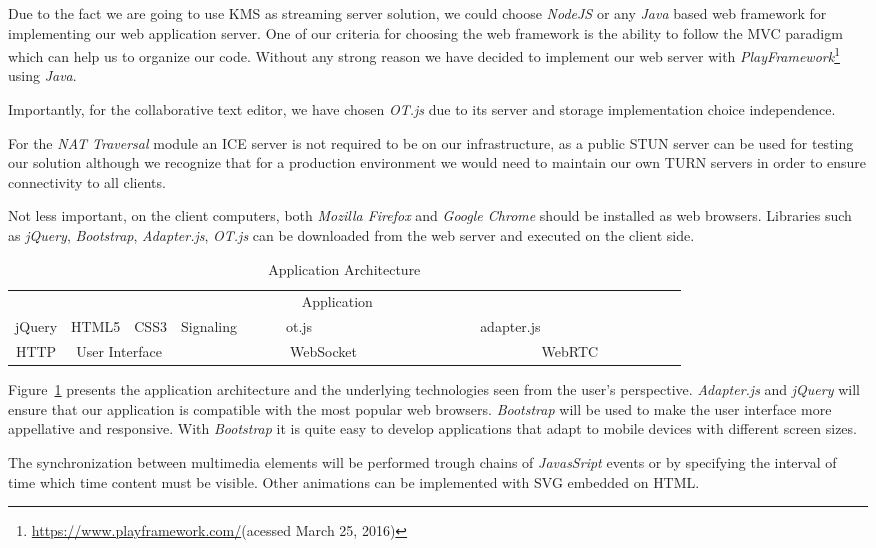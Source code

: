 Due to the fact we are going to use \ac{KMS} as streaming server solution, we could choose \emph{NodeJS} or any \emph{Java} based web framework for implementing our web application server. One of our criteria for choosing the web framework is the ability to follow the \ac{MVC} paradigm which can help us to organize our code. Without any strong reason we have decided to implement our web server with \emph{PlayFramework}\footnote{\url{https://www.playframework.com/}(acessed March 25, 2016)} using \emph{Java}.

Importantly, for the collaborative text editor, we have chosen \emph{OT.js} due to its server and storage implementation choice independence.

For the \emph{NAT Traversal} module an \ac{ICE} server is not required to be on our infrastructure, as a public \ac{STUN} server can be used for testing our solution although we recognize that for a production environment we would need to maintain our own \ac{TURN} servers in order to ensure connectivity to all clients.

Not less important, on the client computers, both \emph{Mozilla Firefox} and \emph{Google Chrome} should be installed as web browsers. Libraries such as \emph{jQuery}, \emph{Bootstrap}, \emph{Adapter.js}, \emph{OT.js} can be downloaded from the web server and executed on the client side.

\begin{table}[H]
\centering
	\caption{Application Architecture}
	\label{table:apparch}
    \begin{tabular}{cccccccc@{}m{0pt}@{}}
	\hline 
\multicolumn{8}{|c|}{\cellcolor{Gray}Application}  &\\[12pt]\cline{1-5}\cline{7-7}
\multicolumn{1}{|c|}{jQuery} & \multicolumn{1}{c|}{HTML5} & \multicolumn{1}{c|}{CSS3} & \multicolumn{1}{c|}{Signaling} & \multicolumn{1}{c|}{~~~~~ot.js~~~~~} & \multicolumn{1}{c|}{\cellcolor{Gray}~~~~~~~~~~~~~~~} & \multicolumn{1}{c|}{adapter.js} &   \multicolumn{1}{c|}{\cellcolor{Gray}~~~~~~~~~~~~~~~} &\\[12pt]\hline
\multicolumn{1}{|c|}{HTTP} & \multicolumn{2}{c|}{User Interface}  & \multicolumn{3}{c|}{WebSocket}    & \multicolumn{2}{c|}{WebRTC}      &\\[12pt]\hline
\end{tabular}
	        \label{fig:apparch}
\end{table}

Figure~\ref{fig:apparch} presents the application architecture and the underlying technologies seen from the user's perspective. \emph{Adapter.js} and \emph{jQuery} will ensure that our application is compatible with the most popular web browsers.
\emph{Bootstrap} will be used to make the user interface more appellative and responsive. With \emph{Bootstrap} it is quite easy to develop applications that adapt to mobile devices with different screen sizes.

The synchronization between multimedia elements will be performed trough chains of \emph{JavasSript} events or by specifying the interval of time which time content must be visible. Other animations can be implemented with \ac{SVG} embedded on \ac{HTML}.
